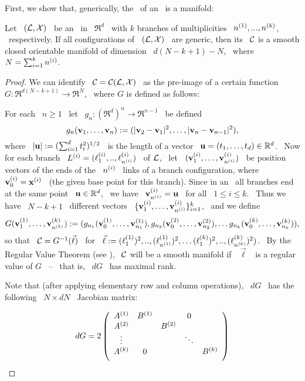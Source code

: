 First, we show that, generically, the \cspace\ of an \smech\ is a
manifold:

\begin{thm}\label{thm:main}
%
Let \ $(\mathcal{L},\mathcal{X})$ \ be an \smech\ in \ $\Re^{d}$ \ with $k$
branches of multiplicities \ $n\sp{({1})},...,n\sp{({k})}$, \ respectively.
If all configurations of \ $(\mathcal{L},\mathcal{X})$ \ are generic, then its
\cspace\ $\mathcal{C}$ is a smooth closed orientable manifold of dimension
\ $d(N-k+1)-N$, \ where \ $N=\sum_{i=1}^{k}n\sp{({i})}$.
%
\end{thm}

\begin{proof}
%
We can identify \ $\mathcal{C}=\mathcal{C}(\mathcal{L},\mathcal{X})$ \ as the pre-image of a certain
function \ $G:\Re^{d(N-k+1)}\to\Re^{N}$, \ where $G$ is defined as
follows:

For each \ $n\geq 1$ \ let \ $g_{n}:(\Re^{d})^{n}\to\Re^{n-1}$ \
be defined \ $$ g_{n}(\mathbf{v}_{1},\dotsc,\mathbf{v}_{n}):=
(|\mathbf{v}_{2}-\mathbf{v}_{1}|^{2},\dotsc,|\mathbf{v}_{n}-\mathbf{v}_{n-1}|^{2}),
$$
where \ $|\mathbf{u}|:=(\sum_{i=1}^{d}t_{i}^{2})^{1/2}$ \ is the length
of a vector \ $\mathbf{u}=(t_{1},\dotsc,t_{d})\in\mathbb{R}^{d}$. \ Now for each
branch \ $L\sp{({i})}=(\ell\sp{({i})}_1,..,\ell\sp{({i})}_{n\sp{({i})}})$ \ of $\mathcal{L}$, \ let
\ $(\mathbf{v}\sp{({i})}_{1},\dotsc,\mathbf{v}\sp{({i})}_{n\sp{({i})}})$ \ be position vectors of
the ends of the \ $n\sp{({i})}$ \ links of a branch configuration,
where \ $\mathbf{v}\sp{({i})}_{0}=\mathbf{x}\sp{({i})}$ \ (the given base point for this
branch). Since in an \smech\ all branches end at the same point \
$\mathbf{u}\in\mathbb{R}^{d}$, \ we have \ $\mathbf{v}\sp{({i})}_{n\sp{({i})}}=\mathbf{u}$ \ for all \
$1\leq i\leq k$. \ Thus we have \ $N-k+1$ \ different vectors \
$\{\mathbf{v}\sp{({i})}_{1},\dotsc,\mathbf{v}\sp{({i})}_{n\sp{({i})}}\}_{i=1}^{k}$, \ and we define
$$ G(\mathbf{v}\sp{({1})}_{1},\dotsc,\mathbf{v}\sp{({k})}_{n\sp{({k})}}):=
(g_{n_{1}}(\mathbf{v}\sp{({1})}_{0},\dotsc,\mathbf{v}\sp{({1})}_{n_{1}}),
g_{n_{2}}(\mathbf{v}\sp{({2})}_{0},\dotsc,\mathbf{v}\sp{({2})}_{n_{2}}),\dotsc
g_{n_{k}}(\mathbf{v}\sp{({k})}_{0},\dotsc,\mathbf{v}\sp{({k})}_{n_{k}})),
$$
so that \ $\mathcal{C}=G^{-1}(\vec{\ell})$ \ for \
$\vec{\ell}:=(\ell\sp{({1})}_{1})^{2},..,(\ell\sp{({1})}_{n\sp{({1})}})^{2},\dotsc
(\ell\sp{({k})}_{1})^{2},..,(\ell\sp{({k})}_{n\sp{({k})}})^{2})$. \ By the Regular
Value Theorem (see \cite[I, Thm.~3.2]{Hi}), \ $\mathcal{C}$ will be a
smooth manifold if \ $\vec{\ell}$ \ is a regular value of $G$ \ --
\ that is, \ $dG$ \ has maximal rank.

Note that (after applying elementary row and column operations), \
$dG$ \ has the following \ $N \times dN$ \ Jacobian matrix:

$$
dG=2\left(
\begin{array}{ccccc}
    A^{(1)} &B^{(1)}& & 0&\\
    A^{(2)} & &B^{(2)}& &\\
     \vdots &  & & \ddots & \\
      A^{(k)} &0 &  & & B^{(k)} \vspace{2mm}\\ \end{array}
\right)
$$


\end{proof}
